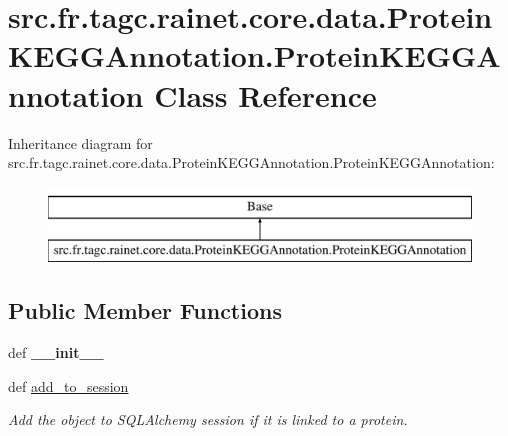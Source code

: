 \hypertarget{classsrc_1_1fr_1_1tagc_1_1rainet_1_1core_1_1data_1_1ProteinKEGGAnnotation_1_1ProteinKEGGAnnotation}{\section{src.\-fr.\-tagc.\-rainet.\-core.\-data.\-Protein\-K\-E\-G\-G\-Annotation.\-Protein\-K\-E\-G\-G\-Annotation Class Reference}
\label{classsrc_1_1fr_1_1tagc_1_1rainet_1_1core_1_1data_1_1ProteinKEGGAnnotation_1_1ProteinKEGGAnnotation}
}
Inheritance diagram for src.\-fr.\-tagc.\-rainet.\-core.\-data.\-Protein\-K\-E\-G\-G\-Annotation.\-Protein\-K\-E\-G\-G\-Annotation\-:\begin{figure}[H]
\begin{center}
\leavevmode
\includegraphics[height=2.000000cm]{classsrc_1_1fr_1_1tagc_1_1rainet_1_1core_1_1data_1_1ProteinKEGGAnnotation_1_1ProteinKEGGAnnotation}
\end{center}
\end{figure}
\subsection*{Public Member Functions}
\begin{DoxyCompactItemize}
\item 
\hypertarget{classsrc_1_1fr_1_1tagc_1_1rainet_1_1core_1_1data_1_1ProteinKEGGAnnotation_1_1ProteinKEGGAnnotation_a7bcc230cfa30f03d7b46ade2f0222c2f}{def {\bfseries \-\_\-\-\_\-init\-\_\-\-\_\-}}\label{classsrc_1_1fr_1_1tagc_1_1rainet_1_1core_1_1data_1_1ProteinKEGGAnnotation_1_1ProteinKEGGAnnotation_a7bcc230cfa30f03d7b46ade2f0222c2f}

\item 
\hypertarget{classsrc_1_1fr_1_1tagc_1_1rainet_1_1core_1_1data_1_1ProteinKEGGAnnotation_1_1ProteinKEGGAnnotation_a7071ef266766e48816fbb8bbdab4d366}{def \hyperlink{classsrc_1_1fr_1_1tagc_1_1rainet_1_1core_1_1data_1_1ProteinKEGGAnnotation_1_1ProteinKEGGAnnotation_a7071ef266766e48816fbb8bbdab4d366}{add\-\_\-to\-\_\-session}}\label{classsrc_1_1fr_1_1tagc_1_1rainet_1_1core_1_1data_1_1ProteinKEGGAnnotation_1_1ProteinKEGGAnnotation_a7071ef266766e48816fbb8bbdab4d366}

\begin{DoxyCompactList}\small\item\em Add the object to S\-Q\-L\-Alchemy session if it is linked to a protein. \end{DoxyCompactList}\end{DoxyCompactItemize}
